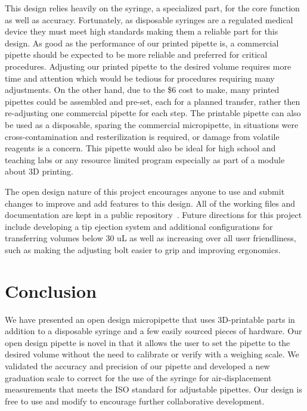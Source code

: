 \documentclass{naturegraphicx}
\begin{document}
This design relies heavily on the syringe, a specialized part, for the core function as well as accuracy.
Fortunately, as disposable syringes are a regulated medical device they must meet high standards making them a reliable part for this design.
As good as the performance of our printed pipette is, a commercial pipette should be expected to be more reliable and preferred for critical procedures. 
Adjusting our printed pipette to the desired volume requires more time and attention which would be tedious for procedures requiring many adjustments.
On the other hand, due to the \$6 cost to make, many printed pipettes could be assembled and pre-set, each for a planned transfer, rather then re-adjusting one commercial pipette for each step.
The printable pipette can also be used as a disposable, sparing the commercial micropipette, in situations were cross-contamination and resterilization is required, or damage from volatile reagents is a concern.
This pipette would also be ideal for high school and teaching labs or any resource limited program especially as part of a module about 3D printing.

The open design nature of this project encourages anyone to use and submit changes to improve and add features to this design.
All of the working files and documentation are kept in a public repository~\cite{BMLmicropipette}.
Future directions for this project include developing a tip ejection system and additional configurations for transferring volumes below 30 uL as well as increasing over all user friendliness, such as making the adjusting bolt easier to grip and improving ergonomics.


\section*{Conclusion}
We have presented an open design micropipette that uses 3D-printable parts in addition to a disposable syringe and a few easily sourced pieces of hardware.
Our open design pipette is novel in that it allows the user to set the pipette to the desired volume without the need to calibrate or verify with a weighing scale. 
We validated the accuracy and precision of our pipette and developed a new graduation scale to correct for the use of the syringe for air-displacement measurements that meets the ISO standard for adjustable pipettes.
Our design is free to use and modify to encourage further collaborative development.
\end{document}
